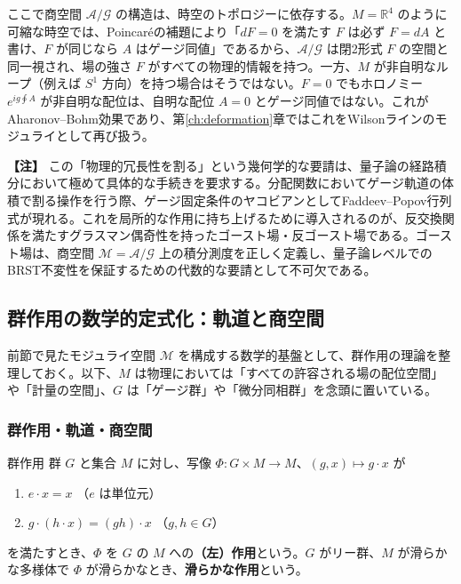 \documentclass[uplatex, dvipdfmx, book]{jsbook}
\let\origsubsection\subsection
\let\origsubsubsection\subsubsection
\renewcommand{\section}{\origsubsection}
\renewcommand{\subsection}{\origsubsubsection}
\renewcommand{\subsubsection}{\paragraph}
\newenvironment{note}{\vspace{1ex}\par\footnotesize\noindent\textbf{【注】}}{\par\vspace{1ex}}
\begin{document}
ここで商空間 $\mathcal{A}/\mathcal{G}$ の構造は、時空のトポロジーに依存する。$M = \mathbb{R}^4$ のように可縮な時空では、Poincar\'eの補題により「$dF = 0$ を満たす $F$ は必ず $F = dA$ と書け、$F$ が同じなら $A$ はゲージ同値」であるから、$\mathcal{A}/\mathcal{G}$ は閉2形式 $F$ の空間と同一視され、場の強さ $F$ がすべての物理的情報を持つ。一方、$M$ が非自明なループ（例えば $S^1$ 方向）を持つ場合はそうではない。$F = 0$ でもホロノミー $e^{ig\oint A}$ が非自明な配位は、自明な配位 $A = 0$ とゲージ同値ではない。これがAharonov--Bohm効果であり、第\ref{ch:deformation}章ではこれをWilsonラインのモジュライとして再び扱う。

\begin{note}
この「物理的冗長性を割る」という幾何学的な要請は、量子論の経路積分において極めて具体的な手続きを要求する。分配関数においてゲージ軌道の体積で割る操作を行う際、ゲージ固定条件のヤコビアンとしてFaddeev--Popov行列式が現れる。これを局所的な作用に持ち上げるために導入されるのが、反交換関係を満たすグラスマン偶奇性を持ったゴースト場・反ゴースト場である。ゴースト場は、商空間 $\mathcal{M} = \mathcal{A} / \mathcal{G}$ 上の積分測度を正しく定義し、量子論レベルでのBRST不変性を保証するための代数的な要請として不可欠である。
\end{note}


\section{群作用の数学的定式化：軌道と商空間}

前節で見たモジュライ空間 $\mathcal{M}$ を構成する数学的基盤として、群作用の理論を整理しておく。以下、$M$ は物理においては「すべての許容される場の配位空間」や「計量の空間」、$G$ は「ゲージ群」や「微分同相群」を念頭に置いている。

\subsection{群作用・軌道・商空間}

\begin{mydef}{群作用}{}
群 $G$ と集合 $M$ に対し、写像 $\Phi: G \times M \to M$、$(g, x) \mapsto g \cdot x$ が
\begin{enumerate}
    \item $e \cdot x = x$ \quad（$e$ は単位元）
    \item $g \cdot (h \cdot x) = (gh) \cdot x$ \quad（$g, h \in G$）
\end{enumerate}
を満たすとき、$\Phi$ を $G$ の $M$ への\textbf{（左）作用}という。$G$ がリー群、$M$ が滑らかな多様体で $\Phi$ が滑らかなとき、\textbf{滑らかな作用}という。
\end{mydef}
\end{document}

